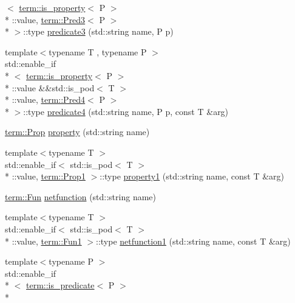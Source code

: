 \begin{DoxyCompactItemize}
$<$ \hyperlink{structpfq__lang_1_1term_1_1is__property}{term\-::is\-\_\-property}$<$ P $>$\\*
\-::value, \hyperlink{structpfq__lang_1_1term_1_1Pred3}{term\-::\-Pred3}$<$ P $>$\\*
 $>$\-::type \hyperlink{namespacepfq__lang_a863e349ba4942bf8a01b61d91859164a}{predicate3} (std\-::string name, P p)
\item 
{\footnotesize template$<$typename T , typename P $>$ }\\std\-::enable\-\_\-if\\*
$<$ \hyperlink{structpfq__lang_1_1term_1_1is__property}{term\-::is\-\_\-property}$<$ P $>$\\*
\-::value \&\&std\-::is\-\_\-pod$<$ T $>$\\*
\-::value, \hyperlink{structpfq__lang_1_1term_1_1Pred4}{term\-::\-Pred4}$<$ P $>$\\*
 $>$\-::type \hyperlink{namespacepfq__lang_a1a9064340f4197e3dd4109a849a224dc}{predicate4} (std\-::string name, P p, const T \&arg)
\item 
\hyperlink{structpfq__lang_1_1term_1_1Prop}{term\-::\-Prop} \hyperlink{namespacepfq__lang_ad70b40071ed0fd32c05ab8e82bbfec61}{property} (std\-::string name)
\item 
{\footnotesize template$<$typename T $>$ }\\std\-::enable\-\_\-if$<$ std\-::is\-\_\-pod$<$ T $>$\\*
\-::value, \hyperlink{structpfq__lang_1_1term_1_1Prop1}{term\-::\-Prop1} $>$\-::type \hyperlink{namespacepfq__lang_a3a4768b9f4e03b86943d332254cca27e}{property1} (std\-::string name, const T \&arg)
\item 
\hyperlink{structpfq__lang_1_1term_1_1Fun}{term\-::\-Fun} \hyperlink{namespacepfq__lang_a9f546a4602872df5ca74050ecb68a6b3}{netfunction} (std\-::string name)
\item 
{\footnotesize template$<$typename T $>$ }\\std\-::enable\-\_\-if$<$ std\-::is\-\_\-pod$<$ T $>$\\*
\-::value, \hyperlink{structpfq__lang_1_1term_1_1Fun1}{term\-::\-Fun1} $>$\-::type \hyperlink{namespacepfq__lang_af215f25fa7ebd61fdc90cf0ef78a3164}{netfunction1} (std\-::string name, const T \&arg)
\item 
{\footnotesize template$<$typename P $>$ }\\std\-::enable\-\_\-if\\*
$<$ \hyperlink{structpfq__lang_1_1term_1_1is__predicate}{term\-::is\-\_\-predicate}$<$ P $>$\\*

\end{DoxyCompactItemize}
